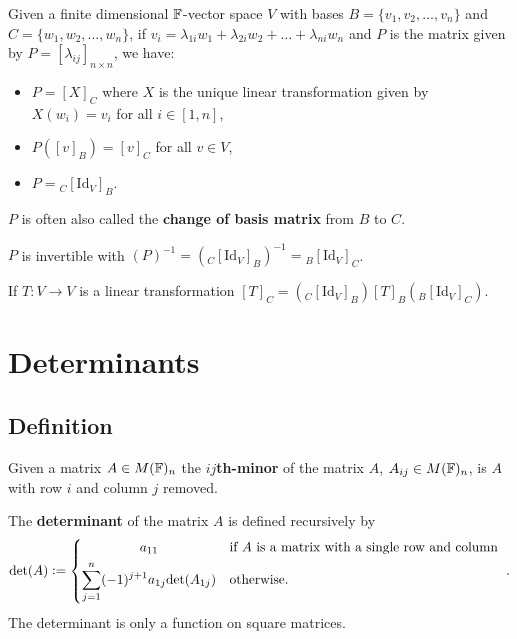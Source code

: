 \documentclass[../Year1/Year1.tex]{subfiles}
\begin{document}
\begin{theorem}
    Given a finite dimensional $\mathbb{F}$-vector space $V$ with bases $B = \{v_1,v_2,\ldots,v_n\}$ and $C = \{w_1,w_2,\ldots,w_n\}$, if $v_i = \lambda_{1i}w_1 + \lambda_{2i}w_2 + \ldots + \lambda_{ni}w_n$ and $P$ is the matrix given by $P=[\lambda_{ij}]_{n\times n}$, we have: \begin{itemize}
        \item $P=[X]_C$ where $X$ is the unique linear transformation given by $X(w_i)=v_i$ for all $i\in[1,n]$,
        \item $P([v]_B) = [v]_C$ for all $v\in V$,
        \item $P= {}_C[\text{Id}_V]_B$.
    \end{itemize}
    $P$ is often also called the \textbf{change of basis matrix} from $B$ to $C$.
\end{theorem}

\begin{corollary}
    $P$ is invertible with $(P)^{-1}= ({}_C[\text{Id}_V]_B)^{-1} = {}_B[\text{Id}_V]_C$. 
\end{corollary}

\begin{theorem}
    If $T:V\rightarrow V$ is a linear transformation $[T]_C = ({}_C[\text{Id}_V]_B)[T]_B({}_B[\text{Id}_V]_C)$.
\end{theorem}

\section{Determinants}

\subsection{Definition}

\begin{definition}
    Given a matrix $A\in M(\mathbb{F})_n$ the \textbf{$ij$th-minor} of the matrix $A$, $A_{ij}\in M(\mathbb{F})_n$, is $A$ with row $i$ and column $j$ removed.
\end{definition}

\begin{definition}[Determinant]
    The \textbf{determinant} of the matrix $A$ is defined recursively by \[
    \text{det}(A) := 
    \begin{dcases}
    \omit\hfil $a_{11}$\hfil & \textcolor{black}{\text{if }} A \textcolor{black}{\text{ is a matrix with a single row and column }}\\
    \sum_{j=1}^n (-1)^{j+1} a_{1j} \text{det}(A_{1j}) & \textcolor{black}{\text{otherwise.}}
    \end{dcases} 
    \textcolor{black}{.}
    \]
    The determinant is only a function on square matrices.
\end{definition}
\end{document}
